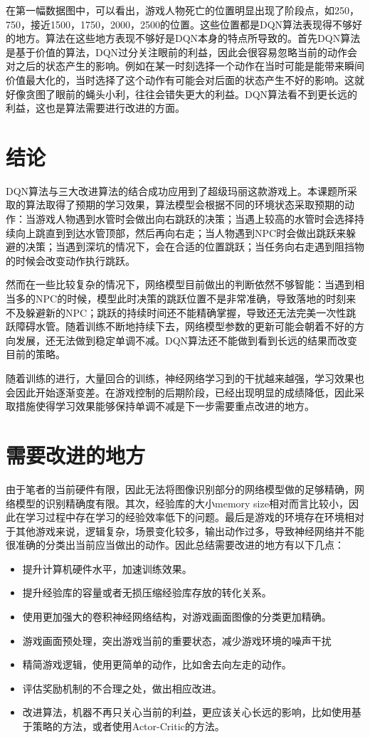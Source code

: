 在第一幅数据图中，可以看出，游戏人物死亡的位置明显出现了阶段点，如250，750，接近1500，1750，2000，2500的位置。这些位置都是DQN算法表现得不够好的地方。算法在这些地方表现不够好是DQN本身的特点所导致的。首先DQN算法是基于价值的算法，DQN过分关注眼前的利益，因此会很容易忽略当前的动作会对之后的状态产生的影响。例如在某一时刻选择一个动作在当时可能是能带来瞬间价值最大化的，当时选择了这个动作有可能会对后面的状态产生不好的影响。这就好像贪图了眼前的蝇头小利，往往会错失更大的利益。DQN算法看不到更长远的利益，这也是算法需要进行改进的方面。
\section{结论}
DQN算法与三大改进算法的结合成功应用到了超级玛丽这款游戏上。本课题所采取的算法取得了预期的学习效果，算法模型会根据不同的环境状态采取预期的动作：当游戏人物遇到水管时会做出向右跳跃的决策；当遇上较高的水管时会选择持续向上跳直到到达水管顶部，然后再向右走；当人物遇到NPC时会做出跳跃来躲避的决策；当遇到深坑的情况下，会在合适的位置跳跃；当任务向右走遇到阻挡物的时候会改变动作执行跳跃。

然而在一些比较复杂的情况下，网络模型目前做出的判断依然不够智能：当遇到相当多的NPC的时候，模型此时决策的跳跃位置不是非常准确，导致落地的时刻来不及躲避新的NPC；跳跃的持续时间还不能精确掌握，导致还无法完美一次性跳跃障碍水管。随着训练不断地持续下去，网络模型参数的更新可能会朝着不好的方向发展，还无法做到稳定单调不减。DQN算法还不能做到看到长远的结果而改变目前的策略。

随着训练的进行，大量回合的训练，神经网络学习到的干扰越来越强，学习效果也会因此开始逐渐变差。在游戏控制的后期阶段，已经出现明显的成绩降低，因此采取措施使得学习效果能够保持单调不减是下一步需要重点改进的地方。

\section{需要改进的地方}
由于笔者的当前硬件有限，因此无法将图像识别部分的网络模型做的足够精确，网络模型的识别精确度有限。其次，经验库的大小memory size相对而言比较小，因此在学习过程中存在学习的经验效率低下的问题。最后是游戏的环境存在环境相对于其他游戏来说，逻辑复杂，场景变化较多，输出动作过多，导致神经网络并不能很准确的分类出当前应当做出的动作。因此总结需要改进的地方有以下几点：
\begin{itemize}
    \item 提升计算机硬件水平，加速训练效果。
    \item 提升经验库的容量或者无损压缩经验库存放的转化关系。
    \item 使用更加强大的卷积神经网络结构，对游戏画面图像的分类更加精确。
    \item 游戏画面预处理，突出游戏当前的重要状态，减少游戏环境的噪声干扰
    \item 精简游戏逻辑，使用更简单的动作，比如舍去向左走的动作。
    \item 评估奖励机制的不合理之处，做出相应改进。
    \item 改进算法，机器不再只关心当前的利益，更应该关心长远的影响，比如使用基于策略的方法，或者使用Actor-Critic的方法。
\end{itemize}